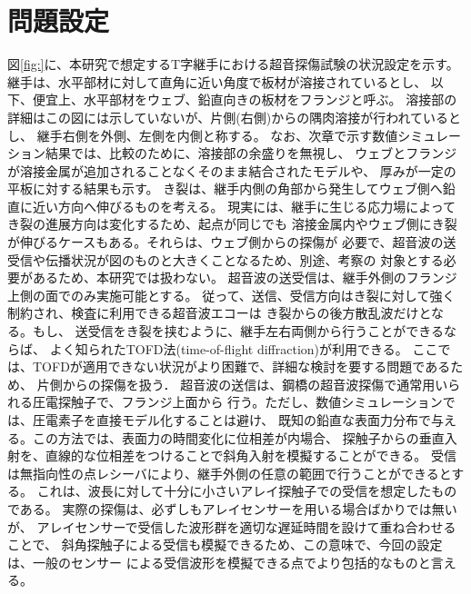 ﻿%
\section{問題設定}
図\ref{fig:}に、本研究で想定するT字継手における超音探傷試験の状況設定を示す。
継手は、水平部材に対して直角に近い角度で板材が溶接されているとし、
以下、便宜上、水平部材をウェブ、鉛直向きの板材をフランジと呼ぶ。
溶接部の詳細はこの図には示していないが、片側(右側)からの隅肉溶接が行われているとし、
継手右側を外側、左側を内側と称する。
なお、次章で示す数値シミュレーション結果では、比較のために、溶接部の余盛りを無視し、
ウェブとフランジが溶接金属が追加されることなくそのまま結合されたモデルや、
厚みが一定の平板に対する結果も示す。
き裂は、継手内側の角部から発生してウェブ側へ鉛直に近い方向へ伸びるものを考える。
現実には、継手に生じる応力場によってき裂の進展方向は変化するため、起点が同じでも
溶接金属内やウェブ側にき裂が伸びるケースもある。それらは、ウェブ側からの探傷が
必要で、超音波の送受信や伝播状況が図のものと大きくことなるため、別途、考察の
対象とする必要があるため、本研究では扱わない。
超音波の送受信は、継手外側のフランジ上側の面でのみ実施可能とする。
従って、送信、受信方向はき裂に対して強く制約され、検査に利用できる超音波エコーは
き裂からの後方散乱波だけとなる。もし、
送受信をき裂を挟むように、継手左右両側から行うことができるならば、
よく知られたTOFD法(time-of-flight diffraction)が利用できる。
ここでは、TOFDが適用できない状況がより困難で、詳細な検討を要する問題であるため、
片側からの探傷を扱う．
超音波の送信は、鋼橋の超音波探傷で通常用いられる圧電探触子で、フランジ上面から
行う。ただし、数値シミュレーションでは、圧電素子を直接モデル化することは避け、
既知の鉛直な表面力分布で与える。この方法では、表面力の時間変化に位相差が内場合、
探触子からの垂直入射を、直線的な位相差をつけることで斜角入射を模擬することができる。
受信は無指向性の点レシーバにより、継手外側の任意の範囲で行うことができるとする。
これは、波長に対して十分に小さいアレイ探触子での受信を想定したものである。
実際の探傷は、必ずしもアレイセンサーを用いる場合ばかりでは無いが、
アレイセンサーで受信した波形群を適切な遅延時間を設けて重ね合わせることで、
斜角探触子による受信も模擬できるため、この意味で、今回の設定は、一般のセンサー
による受信波形を模擬できる点でより包括的なものと言える。
